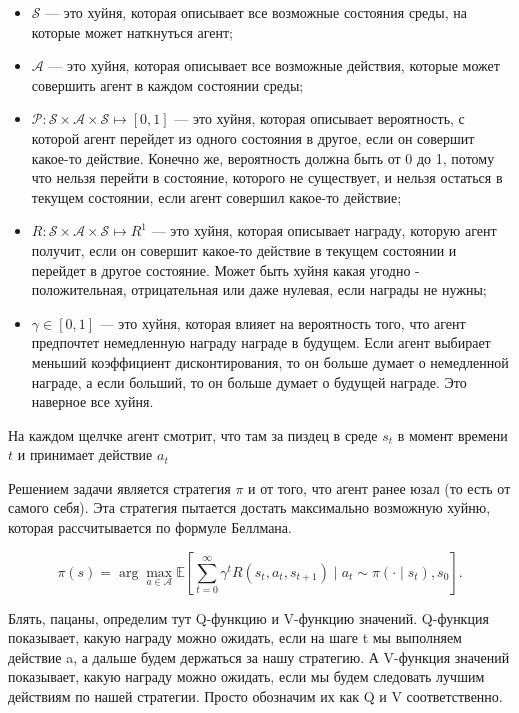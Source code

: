 \begin{itemize}[label=---]
	\item \(\mathcal{S}\) --- это хуйня, которая описывает все возможные состояния среды, на которые может наткнуться агент;
	\item \( \mathcal{A} \) --- это хуйня, которая описывает все возможные действия, которые может совершить агент в каждом состоянии среды;
	\item \( \mathcal{P}: \mathcal{S} \times \mathcal{A} \times \mathcal{S} \mapsto [0, 1] \) --- это хуйня, которая описывает вероятность, с которой агент перейдет из одного состояния в другое, если он совершит какое-то действие. Конечно же, вероятность должна быть от 0 до 1, потому что нельзя перейти в состояние, которого не существует, и нельзя остаться в текущем состоянии, если агент совершил какое-то действие;
	\item \( R: \mathcal{S} \times \mathcal{A} \times \mathcal{S} \mapsto R^1 \) --- это хуйня, которая описывает награду, которую агент получит, если он совершит какое-то действие в текущем состоянии и перейдет в другое состояние. Может быть хуйня какая угодно - положительная, отрицательная или даже нулевая, если награды не нужны;
	\item \( \gamma \in [0, 1] \) --- это хуйня, которая влияет на вероятность того, что агент предпочтет немедленную награду награде в будущем. Если агент выбирает меньший коэффициент дисконтирования, то он больше думает о немедленной награде, а если больший, то он больше думает о будущей награде. Это наверное все хуйня.
\end{itemize}

На каждом щелчке агент смотрит, что там за пиздец в среде \(s_t\) в момент времени \(t\) и принимает действие \(a_t\)

Решением задачи является стратегия \( \pi \) и от того, что агент ранее юзал (то есть от самого себя). Эта стратегия пытается достать максимально возможную хуйню, которая рассчитывается по формуле Беллмана.

\begin{equation}
	\pi(s) = \arg\max_{a \in \mathcal{A}} \mathbb{E} \left[ \sum_{t=0}^{\infty} \gamma^t R(s_t, a_t, s_{t+1}) \mid a_t \sim \pi(\cdot \mid s_t), s_0 \right].
	\label{eq:Q}
\end{equation}


Блять, пацаны, определим тут Q-функцию и V-функцию значений. Q-функция показывает, какую награду можно ожидать, если на шаге t мы выполняем действие a, а дальше будем держаться за нашу стратегию. А V-функция значений показывает, какую награду можно ожидать, если мы будем следовать лучшим действиям по нашей стратегии. Просто обозначим их как Q и V соответственно.

